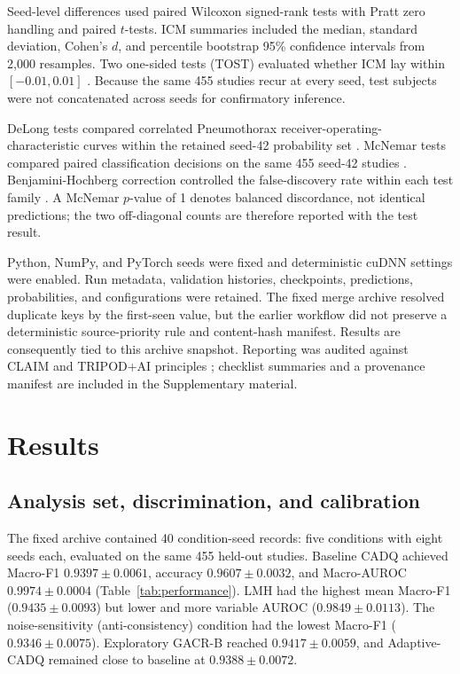 \documentclass[a4paper,fleqn]{cas-sc}
\begin{document}
Seed-level differences used paired Wilcoxon signed-rank tests with Pratt zero
handling and paired $t$-tests. ICM summaries included the median, standard
deviation, Cohen's $d$, and percentile bootstrap 95\% confidence intervals from
2,000 resamples. Two one-sided tests (TOST) evaluated whether ICM lay within
$[-0.01,0.01]$ \cite{lakens2017equivalence}. Because the same 455 studies recur
at every seed, test subjects were not concatenated across seeds for
confirmatory inference.

DeLong tests compared correlated Pneumothorax receiver-operating-characteristic
curves within the retained seed-42 probability set \cite{delong1988roc}.
McNemar tests compared paired classification decisions on the same 455 seed-42
studies \cite{mcnemar1947correlated}. Benjamini-Hochberg correction controlled
the false-discovery rate within each test family
\cite{benjamini1995fdr}. A McNemar $p$-value of 1 denotes balanced discordance,
not identical predictions; the two off-diagonal counts are therefore reported
with the test result.

Python, NumPy, and PyTorch seeds were fixed and deterministic cuDNN settings
were enabled. Run metadata, validation histories, checkpoints, predictions,
probabilities, and configurations were retained. The fixed merge archive
resolved duplicate keys by the first-seen value, but the earlier workflow did
not preserve a deterministic source-priority rule and content-hash manifest.
Results are consequently tied to this archive snapshot. Reporting was audited
against CLAIM and TRIPOD+AI principles
\cite{mongan2024claim,collins2024tripodai}; checklist summaries and a provenance
manifest are included in the Supplementary material.

\section{Results}\label{sec:results}

\subsection{Analysis set, discrimination, and calibration}\label{sec:performance}

The fixed archive contained 40 condition-seed records: five conditions with
eight seeds each, evaluated on the same 455 held-out studies. Baseline CADQ
achieved Macro-F1 $0.9397\pm0.0061$, accuracy $0.9607\pm0.0032$, and
Macro-AUROC $0.9974\pm0.0004$ (Table~\ref{tab:performance}). LMH had the
highest mean Macro-F1 ($0.9435\pm0.0093$) but lower and more variable AUROC
($0.9849\pm0.0113$). The noise-sensitivity (anti-consistency) condition had
the lowest Macro-F1 ($0.9346\pm0.0075$). Exploratory GACR-B reached
$0.9417\pm0.0059$, and
Adaptive-CADQ remained close to baseline at $0.9388\pm0.0072$.
\end{document}
